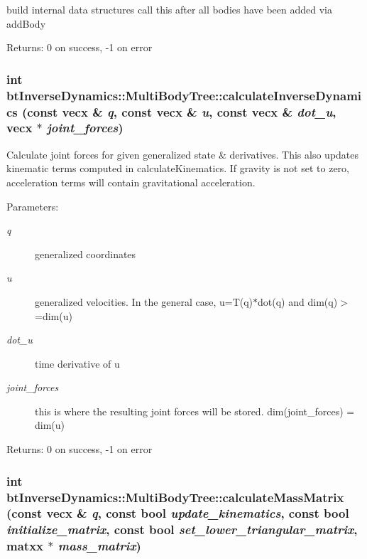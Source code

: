 build internal data structures call this after all bodies have been added via addBody \begin{Desc}
\item[Returns:]0 on success, -1 on error \end{Desc}
\hypertarget{classbt_inverse_dynamics_1_1_multi_body_tree_20e281422ee7504a25357275c08d5690}{
\subsubsection[calculateInverseDynamics]{\setlength{\rightskip}{0pt plus 5cm}int btInverseDynamics::MultiBodyTree::calculateInverseDynamics (const vecx \& {\em q}, \/  const vecx \& {\em u}, \/  const vecx \& {\em dot\_\-u}, \/  vecx $\ast$ {\em joint\_\-forces})}}
\label{classbt_inverse_dynamics_1_1_multi_body_tree_20e281422ee7504a25357275c08d5690}


Calculate joint forces for given generalized state \& derivatives. This also updates kinematic terms computed in calculateKinematics. If gravity is not set to zero, acceleration terms will contain gravitational acceleration. \begin{Desc}
\item[Parameters:]
\begin{description}
\item[{\em q}]generalized coordinates \item[{\em u}]generalized velocities. In the general case, u=T(q)$\ast$dot(q) and dim(q)$>$=dim(u) \item[{\em dot\_\-u}]time derivative of u \item[{\em joint\_\-forces}]this is where the resulting joint forces will be stored. dim(joint\_\-forces) = dim(u) \end{description}
\end{Desc}
\begin{Desc}
\item[Returns:]0 on success, -1 on error \end{Desc}
\hypertarget{classbt_inverse_dynamics_1_1_multi_body_tree_0a767d639bb90ad3b1cb529eb26baa75}{
\subsubsection[calculateMassMatrix]{\setlength{\rightskip}{0pt plus 5cm}int btInverseDynamics::MultiBodyTree::calculateMassMatrix (const vecx \& {\em q}, \/  const bool {\em update\_\-kinematics}, \/  const bool {\em initialize\_\-matrix}, \/  const bool {\em set\_\-lower\_\-triangular\_\-matrix}, \/  matxx $\ast$ {\em mass\_\-matrix})}}
\label{classbt_inverse_dynamics_1_1_multi_body_tree_0a767d639bb90ad3b1cb529eb26baa75}


